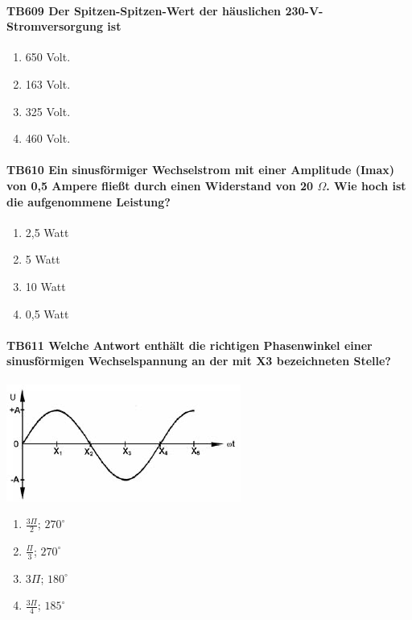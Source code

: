 \documentclass[8pt]{article}
\begin{document}
\begin{enumerate}
\paragraph*{TB609 Der Spitzen-Spitzen-Wert der häuslichen 230-V-Stromversorgung ist}
\begin{enumerate}[nolistsep,label=\Alph*]
\item 650 Volt.
\item 163 Volt.
\item 325 Volt.
\item 460 Volt.
\end{enumerate}



\paragraph*{TB610 Ein sinusförmiger Wechselstrom mit einer Amplitude (Imax) von 0,5 Ampere fließt durch einen Widerstand von 20 $\Omega$. Wie hoch ist die aufgenommene Leistung?}
\begin{enumerate}[nolistsep,label=\Alph*]
\item 2,5 Watt
\item 5 Watt
\item 10 Watt
\item 0,5 Watt
\end{enumerate}



\paragraph*{TB611 Welche Antwort enthält die richtigen Phasenwinkel einer sinusförmigen Wechselspannung an der mit X3 bezeichneten Stelle?}
\begin{center}
	\begin{minipage}{\linewidth}
		\centering
		\includegraphics[scale=1.0]{pics/tb611_a.jpg}
	\end{minipage}
\end{center}
\begin{enumerate}[nolistsep,label=\Alph*]
\item $\frac{3\Pi}{2}$; $270^{\circ}$
\item $\frac{\Pi}{3}$; $270^{\circ}$
\item $3\Pi$; $180^{\circ}$
\item $\frac{3\Pi}{4}$; $185^{\circ}$
\end{enumerate}



\end{enumerate}
\end{document}
